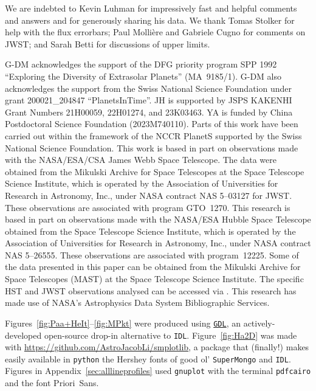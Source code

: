 \documentclass[twocolumn,twocolumnappendix]{aastex631}
\newcommand{\neuI}[1]{{\leavevmode{\boldmath\bfseries#1}}}
\renewcommand{\neuI}[1]{{\leavevmode#1}}
\begin{document}
\begin{acknowledgments}
{\small
%
We are indebted to Kevin Luhman for impressively fast and helpful comments and answers and for generously sharing his data. We thank Tomas Stolker for help with the flux errorbars; Paul Molli\`ere and Gabriele Cugno for comments on JWST; and Sarah Betti for discussions of upper limits.


G-DM acknowledges the support of the DFG priority program SPP 1992 ``Exploring the Diversity of Extrasolar Planets'' (MA~9185/1).
G-DM also acknowledges the support from the Swiss National Science Foundation under grant
200021\_204847
``PlanetsInTime''.
JH is supported by JSPS KAKENHI Grant Numbers 21H00059, 22H01274, and 23K03463.
YA is funded by China Postdoctoral Science Foundation (2023M740110).
%
Parts of this work have been carried out within the framework of the NCCR PlanetS supported by the Swiss National Science Foundation.
%
\neuI{%
This work is based in part on observations made with the NASA/ESA/CSA James Webb Space Telescope. The data were obtained from the Mikulski Archive for Space Telescopes at the Space Telescope Science Institute, which is operated by the Association of Universities for Research in Astronomy, Inc., under NASA contract NAS 5--03127 for JWST. These observations are associated with program GTO~1270.
%
This research is based in part on observations made with the NASA/ESA Hubble Space Telescope obtained from the Space Telescope Science Institute, which is operated by the Association of Universities for Research in Astronomy, Inc., under NASA contract NAS 5--26555. These observations are associated with program~12225.
%
Some of the data presented in this paper can be obtained from the Mikulski Archive for Space Telescopes (MAST) at the Space Telescope Science Institute. The specific HST and JWST observations analysed can be accessed via \dataset[DOI: 10.17909/2f9b-ea80]{http://dx.doi.org/10.17909/2f9b-ea80}.%
}%
This research has made use of NASA's Astrophysics Data System Bibliographic Services.

Figures~\ref{fig:Paa+HeIt}--\ref{fig:MPkt} were produced using \href{https://github.com/gnudatalanguage/gdl}{\texttt{GDL}}, an actively-developed open-source drop-in alternative to \texttt{IDL}.
\neuI{Figure~\ref{fig:Ha2D} was made with \url{https://github.com/AstroJacobLi/smplotlib}, a package that (finally!) makes easily available in \texttt{python} the Hershey fonts of good ol' \texttt{SuperMongo} and \texttt{IDL}.} %
Figures in Appendix~\ref{sec:alllineprofiles} used \texttt{gnuplot} with the terminal \texttt{pdfcairo} and the font Priori~Sans. %
%
%
  
}
\end{acknowledgments}
\end{document}
